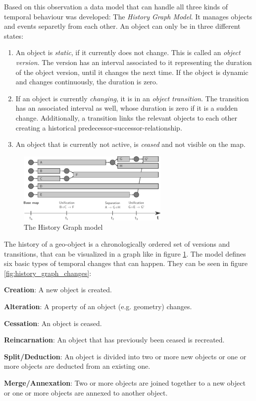 Based on this observation a data model that can handle all three kinds of temporal behaviour was developed: The \emph{History Graph Model}. It manages objects and events separetly from each other. An object can only be in three different states:
\begin{enumerate}
  \item An object is \emph{static}, if it currently does not change. This is called an \emph{object version}. The version has an interval associated to it representing the duration of the object version, until it changes the next time. If the object is dynamic and changes continuously, the duration is zero.
  \item If an object is currently \emph{changing}, it is in an \emph{object transition}. The transition has an associated interval as well, whose duration is zero if it is a sudden change. Additionally, a transition links the relevant objects to each other creating a historical predecessor-successor-relationship.
  \item An object that is currently not active, is \emph{ceased} and not visible on the map.
\end{enumerate}

\begin{figure}[H]
  \centering
  \includegraphics[width=0.65\textwidth]{graphics/basics/stdm/history_graph_model}
  \caption{The History Graph model}
  \label{fig:history_graph_model}
\end{figure}

The history of a geo-object is a chronologically ordered set of versions and transitions, that can be visualized in a graph like in figure \ref{fig:history_graph_model}.
The model defines six basic types of temporal changes that can happen. They can be seen in figure \ref{fig:history_graph_changes}:

\begin{compactitem}
  \item \textbf{Creation}:           A new object is created.
  \item \textbf{Alteration}:         A property of an object (e.g. geometry) changes.
  \item \textbf{Cessation}:          An object is ceased.
  \item \textbf{Reincarnation}:      An object that has previously been ceased is recreated.
  \item \textbf{Split/Deduction}:    An object is divided into two or more new objects or one or more objects are deducted from an existing one.
  \item \textbf{Merge/Annexation}:   Two or more objects are joined together to a new object or one or more objects are annexed to another object.
\end{compactitem}

